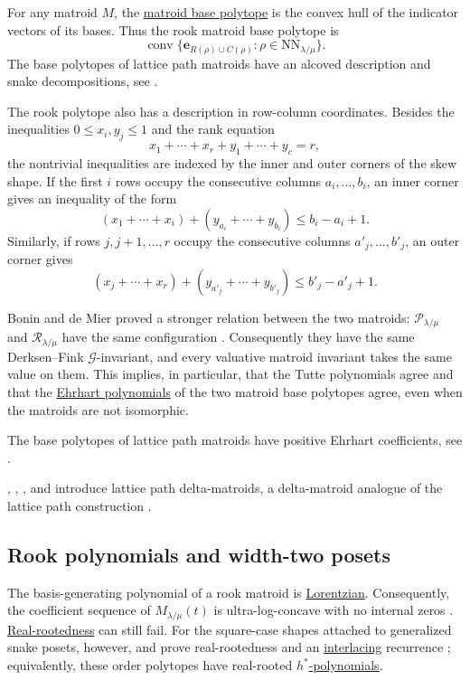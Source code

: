 For any matroid $M$, the \hyperref[matroidPolytopes]{matroid base polytope}
is the convex hull of the indicator vectors of its bases. Thus the rook
matroid base polytope is
\[
  \operatorname{conv}
  \{ \mathbf{e}_{R(\rho)\cup C(\rho)} :
     \rho\in \mathrm{NN}_{\lambda/\mu} \}.
\]
The base polytopes of lattice path matroids have an alcoved description and
snake decompositions, see \cite{BenedettiKnauerValencia2023x}.

The rook polytope also has a description in row-column coordinates. Besides
the inequalities $0\leq x_i,y_j\leq 1$ and the rank equation
\[
  x_1+\dotsb+x_r+y_1+\dotsb+y_c = r,
\]
the nontrivial inequalities are indexed by the inner and outer corners of the
skew shape. If the first $i$ rows occupy the consecutive columns
$a_i,\dotsc,b_i$, an inner corner gives an inequality of the form
\[
  (x_1+\dotsb+x_i) + (y_{a_i}+\dotsb+y_{b_i}) \leq b_i-a_i+1.
\]
Similarly, if rows $j,j+1,\dotsc,r$ occupy the consecutive columns
$a'_j,\dotsc,b'_j$, an outer corner gives
\[
  (x_j+\dotsb+x_r) + (y_{a'_j}+\dotsb+y_{b'_j}) \leq b'_j-a'_j+1.
\]

Bonin and de Mier proved a stronger relation between the two matroids:
$\mathcal{P}_{\lambda/\mu}$ and $\mathcal{R}_{\lambda/\mu}$ have the same
configuration \cite{BoninMier2026}.  Consequently they have the same
Derksen--Fink $\mathcal{G}$-invariant, and every valuative matroid invariant
takes the same value on them. This implies, in particular, that the Tutte
polynomials agree and that the \hyperref[ehrhart]{Ehrhart polynomials} of the
two matroid base polytopes agree, even when the matroids are not isomorphic.

The base polytopes of lattice path matroids have positive Ehrhart coefficients,
see \cite{FerroniMoralesPanova2026x}.

, , , and
 introduce lattice path delta-matroids, a delta-matroid
analogue of the lattice path construction \cite{ChenSanchezVelizYing2023x}.




\subsection[rookMatroidPolynomials]{Rook polynomials and width-two posets}

The basis-generating polynomial of a rook matroid is
\hyperref[lorentzianPolynomial]{Lorentzian}. Consequently, the coefficient
sequence of $M_{\lambda/\mu}(t)$ is ultra-log-concave with no internal zeros
\cite{BrandenHuh2020,AlexanderssonJal2024x}.
\hyperref[realRootedPolynomial]{Real-rootedness} can still fail.
For the square-case shapes attached to generalized snake posets, however,
 and  prove real-rootedness and an
\hyperref[interlacingPolynomials]{interlacing} recurrence
\cite{BraunJal2026x}; equivalently, these order
polytopes have real-rooted \hyperref[hStarPolynomial]{$h^*$-polynomials}.


